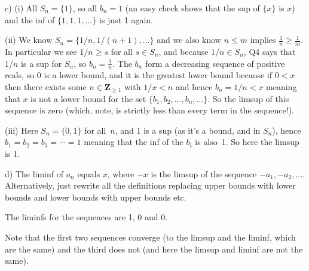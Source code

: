 \documentclass[10pt]{article}
\newcommand{\Z}{\mathbf{Z}}
\begin{document}
c) (i) All $S_n=\{1\}$, so all $b_n=1$ (an easy check shows that the sup of $\{x\}$ is $x$) and the inf of $\{1,1,1,\ldots\}$ is just 1 again.

(ii) We know $S_n=\{1/n,1/(n+1),\ldots\}$ and we also know $n\leq m$ implies $\frac{1}{n}\geq\frac{1}{m}$. In particular we see $1/n\geq s$ for all $s\in S_n$, and because $1/n\in S_n$, Q4 says that $1/n$ is a sup for $S_n$, so $b_n=\frac{1}{n}$. The $b_n$ form a decreasing sequence of positive reals, so 0 is a lower bound, and it is the greatest lower bound because if $0<x$ then there exists some $n\in\Z_{\geq1}$ with $1/x<n$ and hence $b_n=1/n<x$ meaning that $x$ is not a lower bound for the set $\{b_1,b_2,\ldots,b_n,\ldots\}$. So the limsup of this sequence is zero (which, note, is strictly less than every term in the sequence!).

(iii) Here $S_n=\{0,1\}$ for all~$n$, and 1 is a sup (as it's a bound, and in $S_n$), hence $b_1=b_2=b_3=\cdots=1$ meaning that the inf of the $b_i$ is also~1. So here the limsup is 1.

d) The liminf of $a_n$ equals $x$, where $-x$ is the limsup of the sequence $-a_1,-a_2,\ldots$. Alternatively, just rewrite all the definitions replacing upper bounds with lower bounds and lower bounds with upper bounds etc.

The liminfs for the sequences are 1, 0 and 0.

Note that the first two sequences converge (to the limsup and the liminf, which are the same) and the third does not (and here the limsup and liminf are not the same).
\end{document}
